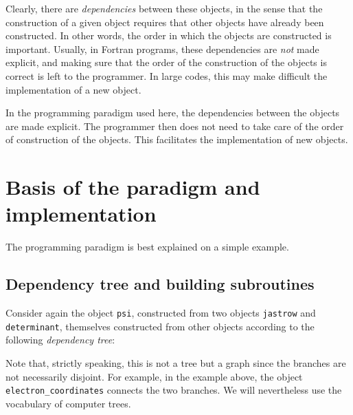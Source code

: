 \documentclass[a4paper,11pt]{article}
\begin{document}
Clearly, there are {\it dependencies} between these objects, in the sense that the construction of a given object requires that other objects have already been constructed. In other words, the order in which the objects are constructed is important. Usually, in Fortran programs, these dependencies are {\it not} made explicit, and making sure that the order of the construction of the objects is correct is left to the programmer. In large codes, this may make difficult the implementation of a new object.

In the programming paradigm used here, the dependencies between the objects are made explicit. The programmer then does not need to take care of the order of construction of the objects. This facilitates the implementation of new objects.

\section{Basis of the paradigm and implementation}

The programming paradigm is best explained on a simple example. 

\subsection{Dependency tree and building subroutines}

Consider again the object {\tt psi}, constructed from two objects {\tt jastrow} and {\tt determinant}, themselves constructed from other objects according to the following {\it dependency tree}:


\begin{center}
\end{center}

Note that, strictly speaking, this is not a tree but a graph since the branches are not necessarily disjoint. For example, in the example above, the object {\tt electron_coordinates} connects the two branches. We will nevertheless use the vocabulary of computer trees.
\end{document}
